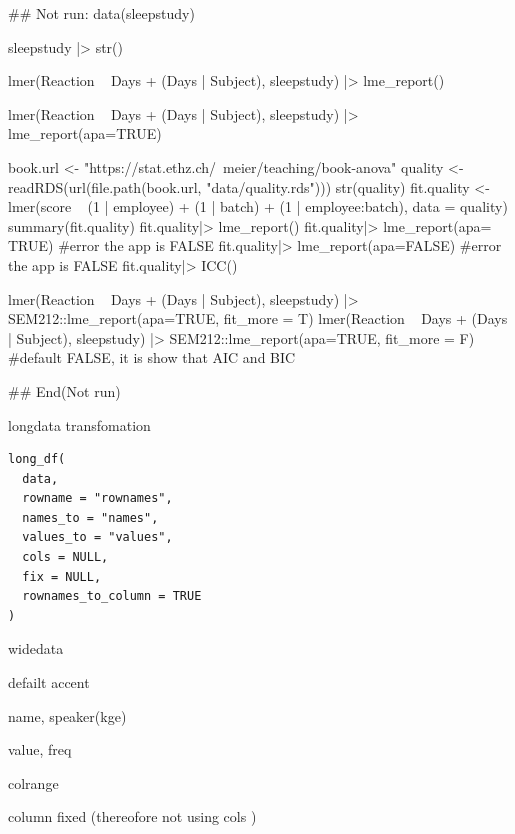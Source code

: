 \documentclass[a4paper]{book}
\begin{document}
%
\begin{Examples}
\begin{ExampleCode}
## Not run: 
data(sleepstudy)

sleepstudy |> str()

lmer(Reaction ~ Days + (Days | Subject), sleepstudy) |> lme_report()

lmer(Reaction ~ Days + (Days | Subject), sleepstudy) |> lme_report(apa=TRUE)


book.url <- "https://stat.ethz.ch/~meier/teaching/book-anova"
quality <- readRDS(url(file.path(book.url, "data/quality.rds")))
str(quality)
fit.quality <- lmer(score ~ (1 | employee) + (1 | batch) +
                     (1 | employee:batch), data = quality)
summary(fit.quality)
fit.quality|> lme_report()
fit.quality|> lme_report(apa= TRUE) #error the app is FALSE
fit.quality|> lme_report(apa=FALSE) #error the app is FALSE
fit.quality|> ICC()

lmer(Reaction ~ Days + (Days | Subject), sleepstudy) |>
SEM212::lme_report(apa=TRUE, fit_more = T)
lmer(Reaction ~ Days + (Days | Subject), sleepstudy) |>
SEM212::lme_report(apa=TRUE, fit_more = F)  #default FALSE, it is show that AIC and BIC


## End(Not run)

\end{ExampleCode}
\end{Examples}
%
\begin{Description}
longdata transfomation
\end{Description}
%
\begin{Usage}
\begin{verbatim}
long_df(
  data,
  rowname = "rownames",
  names_to = "names",
  values_to = "values",
  cols = NULL,
  fix = NULL,
  rownames_to_column = TRUE
)
\end{verbatim}
\end{Usage}
%
\begin{Arguments}
\begin{ldescription}
\item[\code{data}] widedata

\item[\code{rowname}] defailt accent

\item[\code{names\_to}] name, speaker(kge)

\item[\code{values\_to}] value, freq

\item[\code{cols}] colrange

\item[\code{fix}] column fixed (thereofore not using cols )
\end{ldescription}
\end{Arguments}
\end{document}
